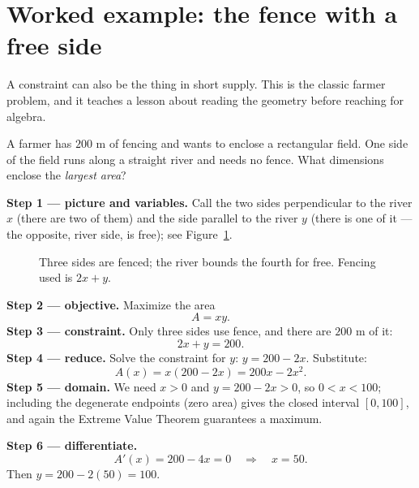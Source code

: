\section{Worked example: the fence with a free side}

A constraint can also be the thing in short supply. This is the classic farmer
problem, and it teaches a lesson about reading the geometry before reaching for
algebra.

\begin{example}\label{ch17:ex-fence}
A farmer has $200$ m of fencing and wants to enclose a rectangular field. One side of
the field runs along a straight river and needs no fence. What dimensions enclose the
\emph{largest area}?
\end{example}

\textbf{Step 1 --- picture and variables.} Call the two sides perpendicular to the
river $x$ (there are two of them) and the side parallel to the river $y$ (there is
one of it --- the opposite, river side, is free); see Figure~\ref{ch17:fig-fence}.

\begin{figure}[H]
\centering
{}
\caption{Three sides are fenced; the river bounds the fourth for free. Fencing used
is $2x+y$.}
\label{ch17:fig-fence}
\end{figure}

\textbf{Step 2 --- objective.} Maximize the area
\[
A = xy.
\]
\textbf{Step 3 --- constraint.} Only three sides use fence, and there are $200$ m of
it:
\[
2x + y = 200.
\]
\textbf{Step 4 --- reduce.} Solve the constraint for $y$: $y = 200 - 2x$. Substitute:
\[
A(x) = x(200-2x) = 200x - 2x^2.
\]
\textbf{Step 5 --- domain.} We need $x>0$ and $y = 200-2x>0$, so $0 < x < 100$;
including the degenerate endpoints (zero area) gives the closed interval $[0,100]$,
and again the Extreme Value Theorem guarantees a maximum.

\textbf{Step 6 --- differentiate.}
\[
A'(x) = 200 - 4x = 0 \quad\Longrightarrow\quad x = 50.
\]
Then $y = 200 - 2(50) = 100$.

